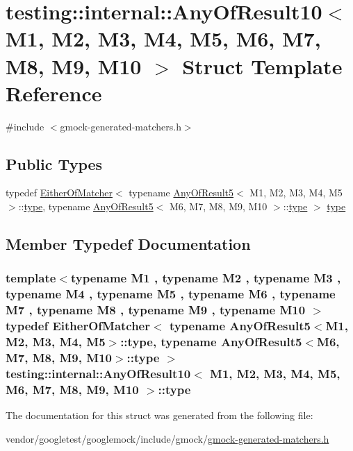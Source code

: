 \hypertarget{structtesting_1_1internal_1_1AnyOfResult10}{}\section{testing\+:\+:internal\+:\+:Any\+Of\+Result10$<$ M1, M2, M3, M4, M5, M6, M7, M8, M9, M10 $>$ Struct Template Reference}
\label{structtesting_1_1internal_1_1AnyOfResult10}


{\ttfamily \#include $<$gmock-\/generated-\/matchers.\+h$>$}

\subsection*{Public Types}
\begin{DoxyCompactItemize}
\item 
typedef \hyperlink{classtesting_1_1internal_1_1EitherOfMatcher}{Either\+Of\+Matcher}$<$ typename \hyperlink{structtesting_1_1internal_1_1AnyOfResult5}{Any\+Of\+Result5}$<$ M1, M2, M3, M4, M5 $>$\+::\hyperlink{structtesting_1_1internal_1_1AnyOfResult10_aa1cb3d733f29716f2015db8a2b6c1c94}{type}, typename \hyperlink{structtesting_1_1internal_1_1AnyOfResult5}{Any\+Of\+Result5}$<$ M6, M7, M8, M9, M10 $>$\+::\hyperlink{structtesting_1_1internal_1_1AnyOfResult10_aa1cb3d733f29716f2015db8a2b6c1c94}{type} $>$ \hyperlink{structtesting_1_1internal_1_1AnyOfResult10_aa1cb3d733f29716f2015db8a2b6c1c94}{type}
\end{DoxyCompactItemize}


\subsection{Member Typedef Documentation}
\subsubsection[{\texorpdfstring{type}{type}}]{\setlength{\rightskip}{0pt plus 5cm}template$<$typename M1 , typename M2 , typename M3 , typename M4 , typename M5 , typename M6 , typename M7 , typename M8 , typename M9 , typename M10 $>$ typedef {\bf Either\+Of\+Matcher}$<$ typename {\bf Any\+Of\+Result5}$<$M1, M2, M3, M4, M5$>$\+::{\bf type}, typename {\bf Any\+Of\+Result5}$<$M6, M7, M8, M9, M10$>$\+::{\bf type} $>$ {\bf testing\+::internal\+::\+Any\+Of\+Result10}$<$ M1, M2, M3, M4, M5, M6, M7, M8, M9, M10 $>$\+::{\bf type}}\hypertarget{structtesting_1_1internal_1_1AnyOfResult10_aa1cb3d733f29716f2015db8a2b6c1c94}{}\label{structtesting_1_1internal_1_1AnyOfResult10_aa1cb3d733f29716f2015db8a2b6c1c94}


The documentation for this struct was generated from the following file\+:\begin{DoxyCompactItemize}
\item 
vendor/googletest/googlemock/include/gmock/\hyperlink{gmock-generated-matchers_8h}{gmock-\/generated-\/matchers.\+h}\end{DoxyCompactItemize}
